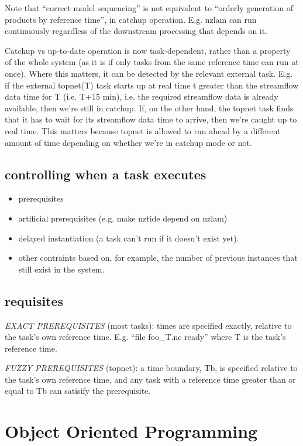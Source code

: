 \documentclass[12pt]{amsart}
\begin{document}
Note that ``correct model sequencing'' is not equivalent to ``orderly
generation of products by reference time'', in catchup operation.  E.g.
nzlam can run continuously regardless of the downstream processing that
depends on it.

Catchup vs up-to-date operation is now task-dependent, rather than a
property of the whole system (as it is if only tasks from the same
reference time can run at once).  Where this matters, it can be detected
by the relevant external task. E.g. if the external topnet(T) task
starts up at real time t greater than the streamflow data time for T
(i.e. T+15 min), i.e. the required streamflow data is already available,
then we're still in catchup. If, on the other hand, the topnet task
finds that it has to wait for its streamflow data time to arrive, then
we're caught up to real time.  This matters because topnet is allowed to
run ahead by a different amount of time depending on whether we're in
catchup mode or not.


\subsection{controlling when a task executes}

\begin{itemize}
 \item  prerequisites
 \item artificial prerequisites (e.g. make nztide depend on nzlam)
 \item delayed instantiation (a task can't run if it doesn't exist yet).
 \item other contraints based on, for example, the number of previous instances
       that still exist in the system.
\end{itemize}


\subsection{requisites}

{\em EXACT PREREQUISITES} (most tasks): times are specified exactly,
relative to the task's own reference time.  E.g. ``file foo\_{T}.nc
ready'' where T is the task's reference time.

{\em FUZZY PREREQUISITES} (topnet): a time boundary, Tb, is specified
relative to the task's own reference time, and any task with a reference
time greater than or equal to Tb can satisify the prerequisite.


\section{Object Oriented Programming}
\end{document}

